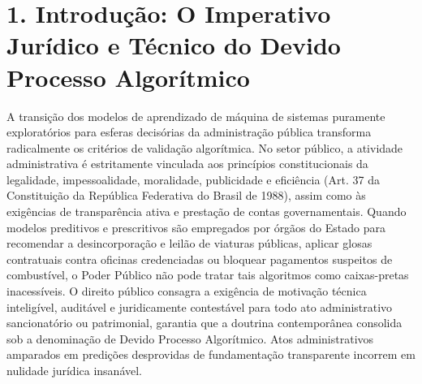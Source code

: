\documentclass[10pt,a4paper,journal]{article}
\begin{document}
\begin{abstract}
4.180.250,00 em despesas anômalas concentradas. Por fim, um ensemble de Isolation Forest (contaminação calibrada de ν = 0,0085, estabilidade multiseed de Jaccard J = 0,8055), operando sob cadeia de custódia criptográfica imutável via hashing SHA-256 em blocos, identifica 662 ordens de serviço anômalas (R\$ 16.581.420,50) e 13.936 eventos atípicos de abastecimento. Este trabalho fornece aos órgãos de controle externo e controladores governamentais um framework epistemologicamente sólido e juridicamente defensável para a governança de inteligência artificial no setor público.

**Palavras-chave:** Inteligência Artificial Explicável (XAI); Devido Processo Algorítmico; Divergência SHAP vs LIME; Redes Complexas; Grafos Bipartidos; Auditoria de Contratações Públicas; Detecção de Anomalias.

\end{abstract}

\section{1. Introdução: O Imperativo Jurídico e Técnico do Devido Processo Algorítmico}
A transição dos modelos de aprendizado de máquina de sistemas puramente exploratórios para esferas decisórias da administração pública transforma radicalmente os critérios de validação algorítmica. No setor público, a atividade administrativa é estritamente vinculada aos princípios constitucionais da legalidade, impessoalidade, moralidade, publicidade e eficiência (Art. 37 da Constituição da República Federativa do Brasil de 1988), assim como às exigências de transparência ativa e prestação de contas governamentais. Quando modelos preditivos e prescritivos são empregados por órgãos do Estado para recomendar a desincorporação e leilão de viaturas públicas, aplicar glosas contratuais contra oficinas credenciadas ou bloquear pagamentos suspeitos de combustível, o Poder Público não pode tratar tais algoritmos como caixas-pretas inacessíveis. O direito público consagra a exigência de motivação técnica inteligível, auditável e juridicamente contestável para todo ato administrativo sancionatório ou patrimonial, garantia que a doutrina contemporânea consolida sob a denominação de Devido Processo Algorítmico. Atos administrativos amparados em predições desprovidas de fundamentação transparente incorrem em nulidade jurídica insanável.
\end{document}
